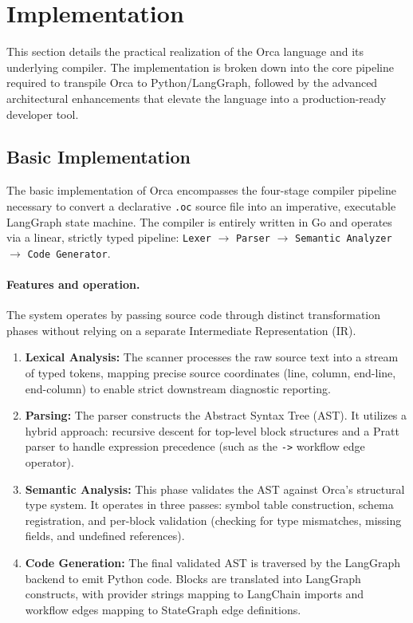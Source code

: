 \documentclass[sigconf,nonacm]{acmart}
\begin{document}
\section{Implementation}
\label{sec:implementation}

This section details the practical realization of the Orca language and its
underlying compiler. The implementation is broken down into the core
pipeline required to transpile Orca to Python/LangGraph, followed by the
advanced architectural enhancements that elevate the language into a
production-ready developer tool.

\subsection{Basic Implementation}
\label{sec:implementation:basic}

The basic implementation of Orca encompasses the four-stage compiler
pipeline necessary to convert a declarative \texttt{.oc} source file into an
imperative, executable LangGraph state machine. The compiler is entirely
written in Go and operates via a linear, strictly typed pipeline:
\texttt{Lexer} $\rightarrow$ \texttt{Parser} $\rightarrow$ \texttt{Semantic
Analyzer} $\rightarrow$ \texttt{Code Generator}.

\paragraph{Features and operation.} The system operates by passing source
code through distinct transformation phases without relying on a separate
Intermediate Representation (IR).
\begin{enumerate}[leftmargin=*]
  \item \textbf{Lexical Analysis:} The scanner processes the raw source text
        into a stream of typed tokens, mapping precise source coordinates
        (line, column, end-line, end-column) to enable strict downstream
        diagnostic reporting.
  \item \textbf{Parsing:} The parser constructs the Abstract Syntax Tree
        (AST). It utilizes a hybrid approach: recursive descent for
        top-level block structures and a Pratt parser to handle expression
        precedence (such as the \texttt{->} workflow edge operator).
  \item \textbf{Semantic Analysis:} This phase validates the AST against
        Orca's structural type system. It operates in three passes: symbol
        table construction, schema registration, and per-block validation
        (checking for type mismatches, missing fields, and undefined
        references).
  \item \textbf{Code Generation:} The final validated AST is traversed by
        the LangGraph backend to emit Python code. Blocks are translated into
        LangGraph constructs, with provider strings mapping to LangChain
        imports and workflow edges mapping to StateGraph edge definitions.
\end{enumerate}
\end{document}
